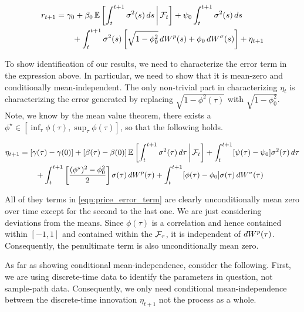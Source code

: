 \documentclass[11pt, letterpaper, twoside, final]{article}
\begin{document}
\begin{equation}
    \label{eqn:price_decomp}
    \begin{alignedat}{1}
        r_{t+1} &= \gamma_0 + \beta_0 \operatorname{\mathbb{E}}\left[\int_t^{t+1} \sigma^2(s) \mathop{}\!d s \,\middle\vert\, \mathcal{F}_t\right] + \psi_0
            \int_{t}^{t+1} \sigma^2(s) \mathop{}\!d s  \\
        &\qquad + \int_t^{t+1} \sigma^2(s) \left[\sqrt{1 - \phi_0^2} \mathop{}\!d W^{p}(s) + \phi_0 \mathop{}\!d
        W^{\sigma}(s)\right] + \eta_{t+1} \\
    \end{alignedat}
\end{equation}

To show identification of our results, we need to characterize the error term in the expression above.
In particular, we need to show that it is mean-zero and conditionally mean-independent.
The only non-trivial part in characterizing $\eta_t$ is characterizing the error generated by replacing $\sqrt{1 -
\phi^2(\tau)}$ with $\sqrt{1 - \phi_0^2}$.
Note, we know by the mean value theorem, there exists a $\phi^{\star} \in [\inf_{\tau} \phi(\tau), \sup_{\tau}
\phi(\tau)]$, so that the following holds.

\begin{equation}
    \label{eqn:price_error_term}
    \begin{alignedat}{1}
        \eta_{t+1} &= [\gamma(\tau)  - \gamma(0)] + [\beta(\tau)  - \beta(0)] \operatorname{\mathbb{E}}\left[\int_t^{t+1} \sigma^2(\tau)
            \mathop{}\!d \tau \,\middle\vert\, \mathcal{F}_t\right] + \int_{t}^{t+1} [\psi(\tau) - \psi_0] \sigma^2(\tau) \mathop{}\!d \tau  \\
        &\qquad + \int_t^{t+1} \left[\frac{(\phi^{\star})^2 - \phi_0^2}{2}\right] \sigma(\tau) \mathop{}\!d W^{p}(\tau)
          + \int_t^{t+1} [\phi(\tau) - \phi_0] \sigma(\tau) \mathop{}\!d W^{\sigma}(\tau) \\
    \end{alignedat}
\end{equation}

All of they terms in  \cref{eqn:price_error_term} are clearly unconditionally mean zero over time except for the
second to the last one.
We are just considering deviations from the means.
Since $\phi(\tau)$ is a correlation and hence contained within $[-1,1]$ and contained within the $\mathcal{F}_{\tau}$, it
is independent of $\mathop{}\!d W^{p}(\tau)$.
Consequently, the penultimate term is also unconditionally mean zero. 

As far as showing conditional mean-independence, consider the following.
First, we are using discrete-time data to identify the parameters in question, not sample-path data.
Consequently, we only need conditional mean-independence between the discrete-time innovation $\eta_{t+1}$ not the
process as a whole.
\end{document}
